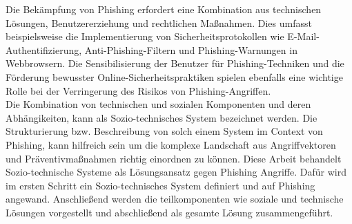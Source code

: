 \documentclass[journal=tosc,final]{iacrtrans}
\begin{document}
Die Bekämpfung von Phishing erfordert eine Kombination aus technischen Lösungen, Benutzererziehung und rechtlichen Maßnahmen. Dies umfasst beispielsweise die Implementierung von Sicherheitsprotokollen wie E-Mail-Authentifizierung, Anti-Phishing-Filtern und Phishing-Warnungen in Webbrowsern. Die Sensibilisierung der Benutzer für Phishing-Techniken und die Förderung bewusster Online-Sicherheitspraktiken spielen ebenfalls eine wichtige Rolle bei der Verringerung des Risikos von Phishing-Angriffen.\\ Die Kombination von technischen und sozialen Komponenten und deren Abhängikeiten, kann als Sozio-technisches System bezeichnet werden. Die Strukturierung bzw. Beschreibung von solch einem System im Context von Phishing, kann hilfreich sein um die komplexe Landschaft aus Angriffvektoren und Präventivmaßnahmen richtig einordnen zu können. Diese Arbeit behandelt Sozio-technische Systeme  als Lösungsansatz gegen Phishing Angriffe. Dafür wird im ersten Schritt ein Sozio-technisches System definiert und auf Phishing angewand. Anschließend werden die teilkomponenten wie soziale und technische Lösungen vorgestellt und abschließend als gesamte Lösung zusammengeführt. 


\newpage
\end{document}
